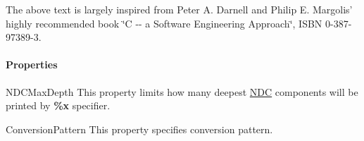 The above text is largely inspired from Peter A. Darnell and Philip E. Margolis' highly recommended book \char`\"{}\-C -\/-\/ a Software
\-Engineering Approach\char`\"{}, I\-S\-B\-N 0-\/387-\/97389-\/3.

\paragraph*{Properties}


\begin{DoxyDescription}
\item[{\ttfamily N\-D\-C\-Max\-Depth} ]This property limits how many deepest \hyperlink{classlog4cplus_1_1NDC}{N\-D\-C} components will be printed by {\bfseries \%x} specifier.


\item[{\ttfamily Conversion\-Pattern} ]This property specifies conversion pattern. 
\end{DoxyDescription}

